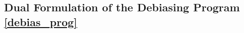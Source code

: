 \documentclass[ejsv2,noshowframe]{imsart}
\theoremstyle{plain}
\theoremstyle{definition}
\theoremstyle{remark}
\renewcommand{\hat}{\widehat}
\begin{document}


\subsection{Dual Formulation of the Debiasing Program \eqref{debias_prog}}
\label{subsec:dual_form}
\end{document}
